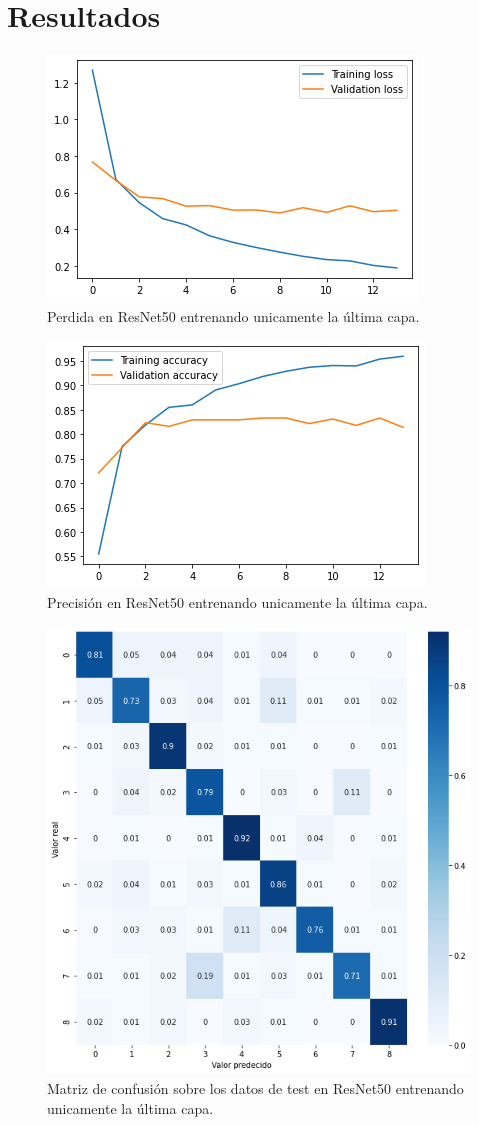 \section{Resultados}

\begin{figure}[H]
  \centering
  \includegraphics[width=0.5\linewidth]{Imagenes/entrenamiento_redes/ult/resnet_ult_loss.png}
  \caption{Perdida en ResNet50 entrenando unicamente la última capa.}
\end{figure}

\begin{figure}[H]
  \centering
  \includegraphics[width=0.5\linewidth]{Imagenes/entrenamiento_redes/ult/resnet_ult_acc.png}
  \caption{Precisión en ResNet50 entrenando unicamente la última capa.}
\end{figure}

\begin{figure}[H]
  \centering
  \includegraphics[width=0.5\linewidth]{Imagenes/entrenamiento_redes/ult/resnet_ult_matriz.png}
  \caption{Matriz de confusión sobre los datos de test en ResNet50 entrenando unicamente la última capa.}
\end{figure}

